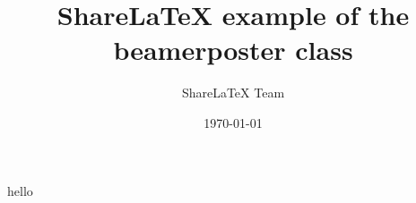 \documentclass{beamer}
\title[Beamer Poster]{ShareLaTeX example of the beamerposter class}
\author[sharelatexteam@sharelate.com]{ShareLaTeX Team}
\institute[Sharelatex University]{The ShareLaTeX institute, Learn faculty}
\date{\today}
\begin{document}
hello
\end{document}
